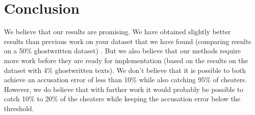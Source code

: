 \documentclass[11pt]{article}
\begin{document}
    \section{Conclusion}

    We believe that our results are promising. We have obtained slightly better
    results than previous work on your dataset that we have found (comparing
    results on a 50\% ghostwritten dataset) \citep{hansen2014,aalykke2016}. But
    we also believe that our methods require more work before they are ready for
    implementation (based on the results on the dataset with 4\% ghostwritten
    texts). We don't believe that it is possible to both achieve an accusation
    error of less than 10\% while also catching 95\% of cheaters. However, we
    do believe that with further work it would probably be possible to catch
    10\% to 20\% of the cheaters while keeping the accusation error below the
    threshold.

    \newpage
    
    
\end{document}
